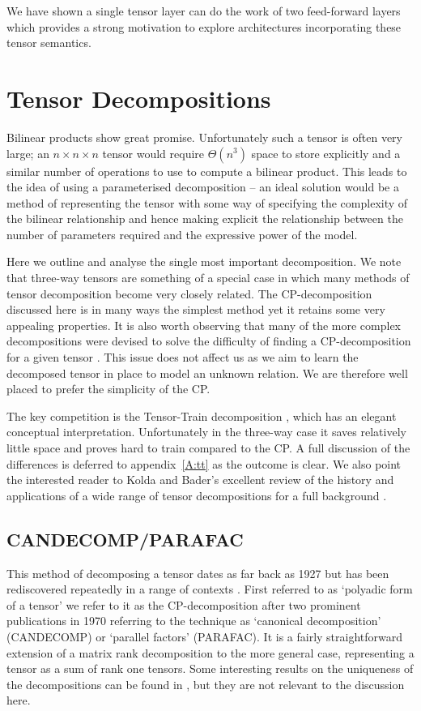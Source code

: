 We have shown a single tensor layer can do the work of two feed-forward
layers which provides a strong motivation to explore architectures incorporating these tensor
semantics.


\section{Tensor Decompositions} %
Bilinear products show great promise. Unfortunately
such a tensor is often very large; an \(n \times n \times n\) tensor
would require \(\Theta(n^3)\) space
to store explicitly and a similar number of operations to use to compute a bilinear product. 
This leads to the idea of using a parameterised decomposition -- an ideal solution
would be a method of representing the tensor with some way of specifying the complexity of the
bilinear relationship and hence making explicit the relationship between the number of parameters
required and the expressive power of the model. 

Here we outline and analyse the single most important decomposition. We note that
three-way tensors are something of a special case in which many methods of tensor decomposition
become very closely related. The CP-decomposition discussed here is in many ways the
simplest method yet it retains some very appealing properties. It is also worth observing that
many of the
more complex decompositions were devised to solve the difficulty of finding a CP-decomposition
for a given tensor \autocite{Kolda2009, Hackbusch2009}. This issue does not affect us as we aim
to learn the decomposed tensor in place to model an unknown relation. We are therefore well placed to
prefer the simplicity of the CP. 

The key competition is the Tensor-Train decomposition
\autocite{Osedelets2011}, which has an elegant conceptual interpretation. Unfortunately in the three-way
case it saves relatively little space and proves hard to train compared to the CP. A full discussion
of the differences is deferred to appendix~\ref{A:tt} as the outcome is clear.
We also point the interested reader to Kolda and
Bader's excellent review of the history and applications of a wide range of tensor decompositions
for a full background \autocite{Kolda2009}.

\subsection{CANDECOMP/PARAFAC}
This method of decomposing a tensor dates as far back as 1927 
\autocite{Hitchcock1927, Hitchcock1928} but has been rediscovered repeatedly in a range of
contexts \autocite{Kolda2009}. First referred to as `polyadic
form of a tensor' we refer to it as the CP-decomposition after two prominent publications in
1970 referring to the technique as `canonical decomposition' (CANDECOMP) \autocite{Carroll1970}
 or `parallel factors' (PARAFAC). \autocite{Harshman1970}
 It is a fairly straightforward
extension of a matrix rank decomposition to the more general case, representing a tensor as
a sum of rank one tensors. Some interesting results on the uniqueness of the decompositions can be found
in \autocite{Kolda2009}, but they are not relevant to the discussion here.


